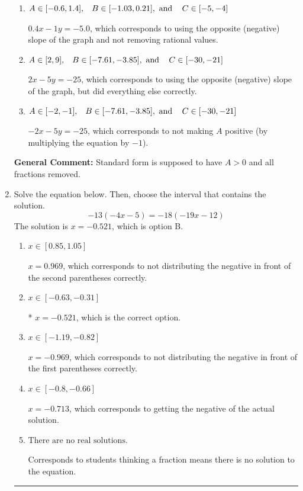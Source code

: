 \documentclass{extbook}[14pt]
\newcommand{\litem}[1]{\item #1

\rule{\textwidth}{0.4pt}}
\begin{document}
\begin{enumerate}
{\begin{enumerate}[label=\Alph*.]
* $2x + 5y = 25$, which is the correct option.
\item \( A \in [-0.6, 1.4], \hspace{3mm} B \in [-1.03, 0.21], \text{ and } \hspace{3mm} C \in [-5, -4] \)

 $0.4x - 1y = -5.0$, which corresponds to using the opposite (negative) slope of the graph and not removing rational values.
\item \( A \in [2, 9], \hspace{3mm} B \in [-7.61, -3.85], \text{ and } \hspace{3mm} C \in [-30, -21] \)

 $2x - 5y = -25$, which corresponds to using the opposite (negative) slope of the graph, but did everything else correctly.
\item \( A \in [-2, -1], \hspace{3mm} B \in [-7.61, -3.85], \text{ and } \hspace{3mm} C \in [-30, -21] \)

 $-2x - 5y = -25$, which corresponds to not making $A$ positive (by multiplying the equation by $-1$).
\end{enumerate}

\textbf{General Comment:} Standard form is supposed to have $A > 0$ and all fractions removed.
}
\litem{
Solve the equation below. Then, choose the interval that contains the solution.
\[ -13(-4x -5) = -18(-19x -12) \]The solution is \( x = -0.521 \), which is option B.\begin{enumerate}[label=\Alph*.]
\item \( x \in [0.85, 1.05] \)

$x = 0.969$, which corresponds to not distributing the negative in front of the second parentheses correctly.
\item \( x \in [-0.63, -0.31] \)

* $x = -0.521$, which is the correct option.
\item \( x \in [-1.19, -0.82] \)

$x = -0.969$, which corresponds to not distributing the negative in front of the first parentheses correctly.
\item \( x \in [-0.8, -0.66] \)

$x = -0.713$, which corresponds to getting the negative of the actual solution.
\item \( \text{There are no real solutions.} \)

Corresponds to students thinking a fraction means there is no solution to the equation.
\end{enumerate}

}
\end{enumerate}
\end{document}
